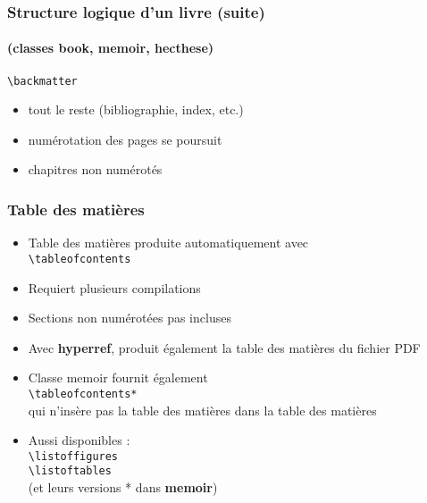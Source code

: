 
\begin{frame}[c,fragile]

	\frametitle{Structure logique d'un livre (suite)}
	\framesubtitle{(classes book, memoir, hecthese)}
	
	\lstinline|\backmatter|
	
	\begin{itemize}
		\item tout le reste (bibliographie, index, etc.)
		\item numérotation des pages se poursuit
		\item chapitres non numérotés
	\end{itemize}
\end{frame}


\begin{frame}[fragile]

	\frametitle{Table des matières}
	
	\begin{itemize}
		\item Table des matières produite automatiquement avec \\
		\lstinline|\tableofcontents|
		\item Requiert plusieurs compilations
		\item Sections non numérotées pas incluses
		\item Avec \textbf{hyperref}, produit également la table des matières du fichier PDF
		
		\pause
		
		\item Classe memoir fournit également \\
		\lstinline|\tableofcontents*| \\
		qui n’insère pas la table des matières dans la table des matières
		
		\pause
		
		\item Aussi disponibles : \\
		\lstinline|\listoffigures| \\
		\lstinline|\listoftables| \\
		(et leurs versions * dans \textbf{memoir})
	\end{itemize}
\end{frame}

